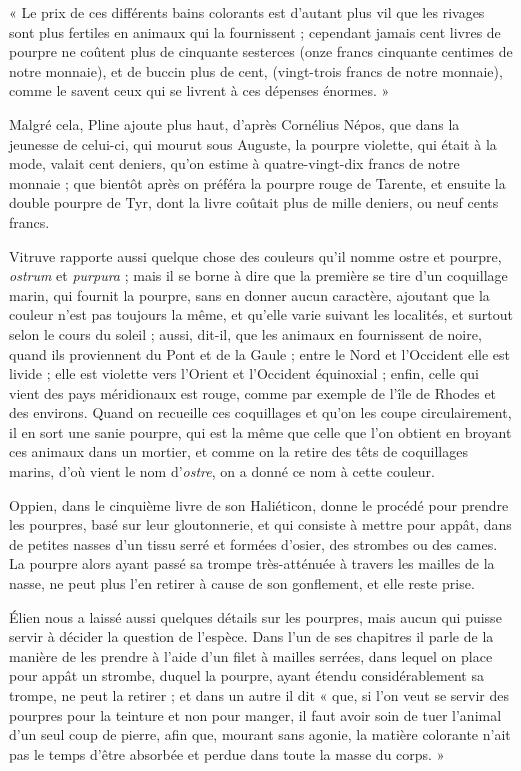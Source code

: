 \documentclass[a4paper, 11pt, oneside, polutonikogreek, french]{article}
\begin{document}
« Le prix de ces différents bains colorants est d'autant plus vil que les rivages sont plus fertiles en animaux qui la fournissent ; cependant jamais cent livres de pourpre ne coûtent plus de cinquante sesterces (onze francs cinquante centimes de notre monnaie), et de buccin plus de cent, (vingt-trois francs de notre monnaie), comme le savent ceux qui se livrent à ces dépenses énormes. »

Malgré cela, Pline ajoute plus haut, d'après Cornélius Népos, que dans la jeunesse de celui-ci, qui mourut sous Auguste, la pourpre violette, qui était à la mode, valait cent deniers, qu'on estime à quatre-vingt-dix francs de notre monnaie ; que bientôt après on préféra la pourpre rouge de Tarente, et ensuite la double pourpre de Tyr, dont la livre coûtait plus de mille deniers, ou neuf cents francs.

Vitruve rapporte aussi quelque chose des couleurs qu'il nomme ostre et pourpre, \emph{ostrum} et \emph{purpura} ; mais il se borne à dire que la première se tire d'un coquillage marin, qui fournit la pourpre, sans en donner aucun caractère, ajoutant que la couleur n'est pas toujours la même, et qu'elle varie suivant les localités, et surtout selon le cours du soleil ; aussi, dit-il, que les animaux en fournissent de noire, quand ils proviennent du Pont et de la Gaule ; entre le Nord et l'Occident elle est livide ; elle est violette vers l'Orient et l'Occident équinoxial ; enfin, celle qui vient des pays méridionaux est rouge, comme par exemple de l'île de Rhodes et des environs. Quand on recueille ces coquillages et qu'on les coupe circulairement, il en sort une sanie pourpre, qui est la même que celle que l'on obtient en broyant ces animaux dans un mortier, et comme on la retire des têts de coquillages marins, d'où vient le nom d'\emph{ostre}, on a donné ce nom à cette couleur.

Oppien, dans le cinquième livre de son Haliéticon, donne le procédé pour prendre les pourpres, basé sur leur gloutonnerie, et qui consiste à mettre pour appât, dans de petites nasses d'un tissu serré et formées d'osier, des strombes ou des cames. La pourpre alors ayant passé sa trompe très-atténuée à travers les mailles de la nasse, ne peut plus l'en retirer à cause de son gonflement, et elle reste prise.

Élien nous a laissé aussi quelques détails sur les pourpres, mais aucun qui puisse servir à décider la question de l'espèce. Dans l'un de ses chapitres il parle de la manière de les prendre à l'aide d'un filet à mailles serrées, dans lequel on place pour appât un strombe, duquel la pourpre, ayant étendu considérablement sa trompe, ne peut la retirer ; et dans un autre il dit « que, si l'on veut se servir des pourpres pour la teinture et non pour manger, il faut avoir soin de tuer l'animal d'un seul coup de pierre, afin que, mourant sans agonie, la matière colorante n'ait pas le temps d'être absorbée et perdue dans toute la masse du corps. »
\end{document}
